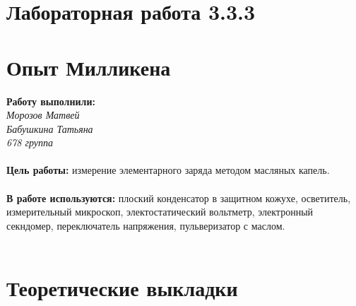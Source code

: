 \documentclass[11pt,a4paper]{article}
\begin{document}
	\part*{Лабораторная работа 3.3.3}
	\part*{Опыт Милликена}
	\textbf{Работу выполнили:} \\
	{\itshape Морозов Матвей \\ Бабушкина Татьяна \\ 678 группа} \\\\
\textbf{Цель работы:} измерение элементарного заряда методом масляных капель.
\\\\
\textbf {В работе используются:} плоский конденсатор в защитном кожухе, осветитель, измерительный микроскоп, электостатический  вольтметр, электронный секндомер, переключатель напряжения, пульверизатор с маслом.
\\
\\
\part*{Теоретические выкладки}
\end{document}

